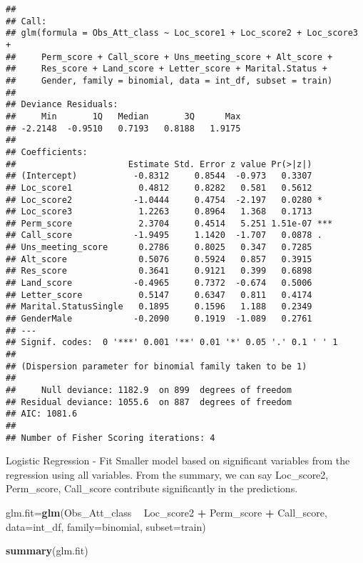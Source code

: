 \documentclass[]{article}
\newenvironment{Shaded}{\begin{snugshade}}{\end{snugshade}}
\newcommand{\KeywordTok}[1]{\textcolor[rgb]{0.13,0.29,0.53}{\textbf{#1}}}
\newcommand{\DataTypeTok}[1]{\textcolor[rgb]{0.13,0.29,0.53}{#1}}
\newcommand{\StringTok}[1]{\textcolor[rgb]{0.31,0.60,0.02}{#1}}
\newcommand{\OperatorTok}[1]{\textcolor[rgb]{0.81,0.36,0.00}{\textbf{#1}}}
\newcommand{\NormalTok}[1]{#1}
\begin{document}
\begin{verbatim}
## 
## Call:
## glm(formula = Obs_Att_class ~ Loc_score1 + Loc_score2 + Loc_score3 + 
##     Perm_score + Call_score + Uns_meeting_score + Alt_score + 
##     Res_score + Land_score + Letter_score + Marital.Status + 
##     Gender, family = binomial, data = int_df, subset = train)
## 
## Deviance Residuals: 
##     Min       1Q   Median       3Q      Max  
## -2.2148  -0.9510   0.7193   0.8188   1.9175  
## 
## Coefficients:
##                      Estimate Std. Error z value Pr(>|z|)    
## (Intercept)           -0.8312     0.8544  -0.973   0.3307    
## Loc_score1             0.4812     0.8282   0.581   0.5612    
## Loc_score2            -1.0444     0.4754  -2.197   0.0280 *  
## Loc_score3             1.2263     0.8964   1.368   0.1713    
## Perm_score             2.3704     0.4514   5.251 1.51e-07 ***
## Call_score            -1.9495     1.1420  -1.707   0.0878 .  
## Uns_meeting_score      0.2786     0.8025   0.347   0.7285    
## Alt_score              0.5076     0.5924   0.857   0.3915    
## Res_score              0.3641     0.9121   0.399   0.6898    
## Land_score            -0.4965     0.7372  -0.674   0.5006    
## Letter_score           0.5147     0.6347   0.811   0.4174    
## Marital.StatusSingle   0.1895     0.1596   1.188   0.2349    
## GenderMale            -0.2090     0.1919  -1.089   0.2761    
## ---
## Signif. codes:  0 '***' 0.001 '**' 0.01 '*' 0.05 '.' 0.1 ' ' 1
## 
## (Dispersion parameter for binomial family taken to be 1)
## 
##     Null deviance: 1182.9  on 899  degrees of freedom
## Residual deviance: 1055.6  on 887  degrees of freedom
## AIC: 1081.6
## 
## Number of Fisher Scoring iterations: 4
\end{verbatim}

Logistic Regression - Fit Smaller model based on significant variables
from the regression using all variables. From the summary, we can say
Loc\_score2, Perm\_score, Call\_score contribute significantly in the
predictions.

\begin{Shaded}
\begin{Highlighting}[]
\NormalTok{glm.fit=}\KeywordTok{glm}\NormalTok{(Obs_Att_class }\OperatorTok{~}\StringTok{ }\NormalTok{Loc_score2 }\OperatorTok{+}\StringTok{ }\NormalTok{Perm_score }\OperatorTok{+}\StringTok{ }\NormalTok{Call_score,}
            \DataTypeTok{data=}\NormalTok{int_df, }\DataTypeTok{family=}\NormalTok{binomial, }\DataTypeTok{subset=}\NormalTok{train)}

\KeywordTok{summary}\NormalTok{(glm.fit)}
\end{Highlighting}
\end{Shaded}
\end{document}
